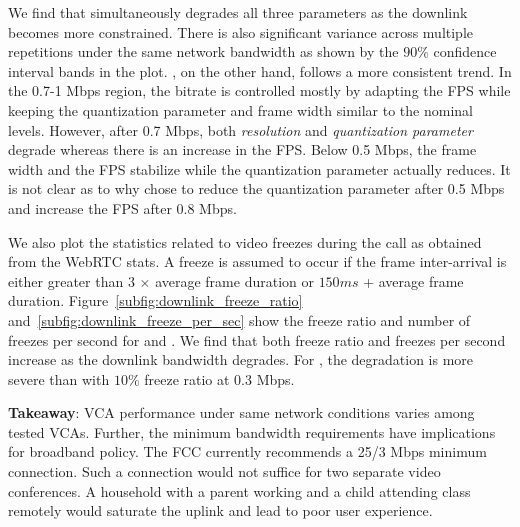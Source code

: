We find that \teamsbrowser simultaneously degrades all three parameters as the downlink becomes more constrained. There is also significant variance across multiple repetitions under the same network bandwidth as shown by the $90\%$ confidence interval bands in the plot. \meet, on the other hand, follows a more consistent trend. In the 0.7-1 Mbps region, the bitrate is controlled mostly by adapting the FPS while keeping the quantization parameter and frame width similar to the nominal levels. However, after 0.7 Mbps, both \textit{resolution} and \textit{quantization parameter} degrade whereas there is an increase in the FPS. Below 0.5 Mbps, the frame width and the FPS stabilize while the quantization parameter actually reduces. It is not clear as to why \meet chose to reduce the quantization parameter after 0.5 Mbps and increase the FPS after 0.8 Mbps. 

We also plot the statistics related to video freezes during the call as obtained from the WebRTC stats. A freeze is assumed to occur if the frame inter-arrival is either greater than 3 $\times$ average frame duration or $150 ms$ + average frame duration.  Figure~\ref{subfig:downlink_freeze_ratio} and~\ref{subfig:downlink_freeze_per_sec} show the freeze ratio and number of freezes per second for \meet and \teamsbrowser. We find that both freeze ratio and freezes per second increase as the downlink bandwidth degrades. For \meet, the degradation is more severe than \teamsbrowser with $10\%$ freeze ratio at 0.3 Mbps. 





\textbf{Takeaway}: VCA performance under same network conditions varies among tested VCAs. Further, the minimum bandwidth requirements have implications for broadband policy. The FCC currently recommends a 25/3 Mbps minimum connection. Such a connection would not suffice for two separate video conferences. A household with a parent working and a child attending class remotely would saturate the uplink and lead to poor user experience. 








